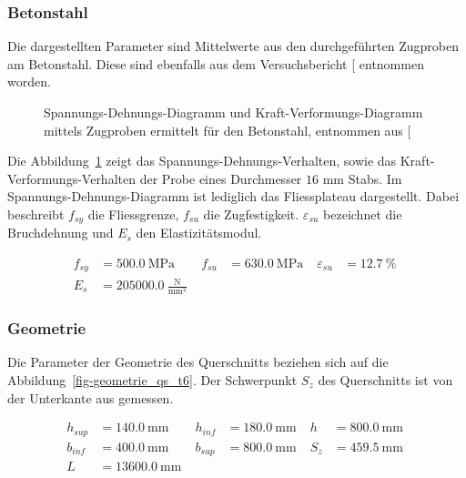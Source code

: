 \documentclass[
  11pt,
  letterpaper,
]{scrreprt}
\begin{document}
\subsubsection{Betonstahl}\label{betonstahl}

Die dargestellten Parameter sind Mittelwerte aus den durchgeführten
Zugproben am Betonstahl. Diese sind ebenfalls aus dem Versuchsbericht
{[}\citeproc{ref-sigrist_versuche_1993}{5}{]} entnommen worden.

\begin{figure}[H]


\caption{\label{fig-sigma_eps_betonstahl}Spannungs-Dehnungs-Diagramm und
Kraft-Verformungs-Diagramm mittels Zugproben ermittelt für den
Betonstahl, entnommen aus {[}\citeproc{ref-sigrist_versuche_1993}{5}{]}}

\end{figure}%

Die Abbildung~\ref{fig-sigma_eps_betonstahl} zeigt das
Spannungs-Dehnungs-Verhalten, sowie das Kraft-Verformungs-Verhalten der
Probe eines Durchmesser \(16\) mm Stabs. Im Spannungs-Dehnungs-Diagramm
ist lediglich das Fliessplateau dargestellt. Dabei beschreibt \(f_{sy}\)
die Fliessgrenze, \(f_{su}\) die Zugfestigkeit. \(\varepsilon_{su}\)
bezeichnet die Bruchdehnung und \(E_s\) den Elastizitätsmodul.

$$
\begin{aligned}
f_{sy} &= 500.0\ \mathrm{MPa} \; 
 &f_{su} &= 630.0\ \mathrm{MPa} \; 
 &\varepsilon_{su} &= 12.7\ \mathrm{\%} \; 
\\[10pt]
 E_{s} &= 205000.0\ \frac{\mathrm{N}}{\mathrm{mm}^{2}} \;
\end{aligned}
$$

\subsubsection{Geometrie}\label{geometrie}

Die Parameter der Geometrie des Querschnitts beziehen sich auf die
Abbildung~\ref{fig-geometrie_qs_t6}. Der Schwerpunkt \(S_z\) des
Querschnitts ist von der Unterkante aus gemessen.

$$
\begin{aligned}
h_{sup} &= 140.0\ \mathrm{mm} \; 
 &h_{inf} &= 180.0\ \mathrm{mm} \; 
 &h &= 800.0\ \mathrm{mm} \; 
\\[10pt]
 b_{inf} &= 400.0\ \mathrm{mm} \; 
 &b_{sup} &= 800.0\ \mathrm{mm} \; 
 &S_{z} &= 459.5\ \mathrm{mm} \; 
\\[10pt]
 L &= 13600.0\ \mathrm{mm} \;
\end{aligned}
$$
\end{document}
